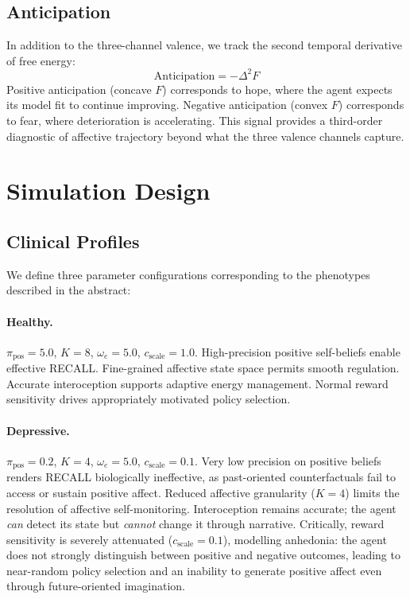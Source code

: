 \documentclass[11pt,a4paper]{article}
\begin{document}
\subsection{Anticipation}

In addition to the three-channel valence, we track the second temporal derivative of free energy:
\begin{equation}
    \text{Anticipation} = -\Delta^2 F
\end{equation}
Positive anticipation (concave $F$) corresponds to hope, where the agent expects its model fit to continue improving. Negative anticipation (convex $F$) corresponds to fear, where deterioration is accelerating. This signal provides a third-order diagnostic of affective trajectory beyond what the three valence channels capture.


\section{Simulation Design}\label{sec:simulation}

\subsection{Clinical Profiles}

We define three parameter configurations corresponding to the phenotypes described in the abstract:

\paragraph{Healthy.} $\pi_{\text{pos}} = 5.0$, $K = 8$, $\omega_e = 5.0$, $c_{\text{scale}} = 1.0$. High-precision positive self-beliefs enable effective RECALL. Fine-grained affective state space permits smooth regulation. Accurate interoception supports adaptive energy management. Normal reward sensitivity drives appropriately motivated policy selection.

\paragraph{Depressive.} $\pi_{\text{pos}} = 0.2$, $K = 4$, $\omega_e = 5.0$, $c_{\text{scale}} = 0.1$. Very low precision on positive beliefs renders RECALL biologically ineffective, as past-oriented counterfactuals fail to access or sustain positive affect. Reduced affective granularity ($K{=}4$) limits the resolution of affective self-monitoring. Interoception remains accurate; the agent \emph{can} detect its state but \emph{cannot} change it through narrative. Critically, reward sensitivity is severely attenuated ($c_{\text{scale}} = 0.1$), modelling anhedonia: the agent does not strongly distinguish between positive and negative outcomes, leading to near-random policy selection and an inability to generate positive affect even through future-oriented imagination.
\end{document}
